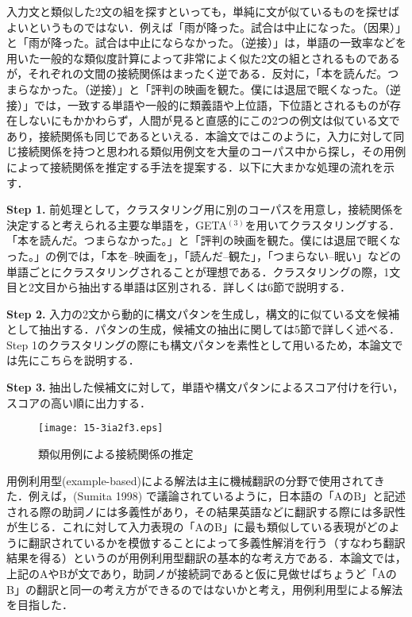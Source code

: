 \documentclass[japanese]{jnlp_1.4}
\begin{document}
入力文と類似した2文の組を探すといっても，単純に文が似ているものを探せばよいというものではない．例えば「雨が降った。試合は中止になった。（因果）」と「雨が降った。試合は中止にならなかった。（逆接）」は，単語の一致率などを用いた一般的な類似度計算によって非常によく似た2文の組とされるものであるが，それぞれの文間の接続関係はまったく逆である．反対に，「本を読んだ。つまらなかった。（逆接）」と「評判の映画を観た。僕には退屈で眠くなった。（逆接）」では，一致する単語や一般的に類義語や上位語，下位語とされるものが存在しないにもかかわらず，人間が見ると直感的にこの2つの例文は似ている文であり，接続関係も同じであるといえる．本論文ではこのように，入力に対して同じ接続関係を持つと思われる類似用例文を大量のコーパス中から探し，その用例によって接続関係を推定する手法を提案する．以下に大まかな処理の流れを示す．

\noindent
\textbf{Step 1.} 
前処理として，クラスタリング用に別のコーパスを用意し，接続関係を決定すると考えられる主要な単語を，GETA$^{(3)}$を用いてクラスタリングする．「本を読んだ。つまらなかった。」と「評判の映画を観た。僕には退屈で眠くなった。」の例では，「本を--映画を」，「読んだ--観た」，「つまらない--眠い」などの単語ごとにクラスタリングされることが理想である．クラスタリングの際，1文目と2文目から抽出する単語は区別される．詳しくは6節で説明する．

\noindent
\textbf{Step 2.} 
入力の2文から動的に構文パタンを生成し，構文的に似ている文を候補として抽出する．パタンの生成，候補文の抽出に関しては5節で詳しく述べる．Step 1のクラスタリングの際にも構文パタンを素性として用いるため，本論文では先にこちらを説明する．

\noindent
\textbf{Step 3.} 
抽出した候補文に対して，単語や構文パタンによるスコア付けを行い，スコアの高い順に出力する．

\begin{figure}[t]
\centerline{\texttt{[image: 15-3ia2f3.eps]}}
\caption{類似用例による接続関係の推定}
\end{figure}

用例利用型(example-based)による解法は主に機械翻訳の分野で使用されてきた．例えば，(Sumita 1998) 
で議論されているように，日本語の「AのB」と記述される際の助詞ノには多義性があり，その結果英語などに翻訳する際には多訳性が生じる．これに対して入力表現の「AのB」に最も類似している表現がどのように翻訳されているかを模倣することによって多義性解消を行う（すなわち翻訳結果を得る）というのが用例利用型翻訳の基本的な考え方である．本論文では，上記のAやBが文であり，助詞ノが接続詞であると仮に見做せばちょうど「AのB」の翻訳と同一の考え方ができるのではないかと考え，用例利用型による解法を目指した．
\end{document}
